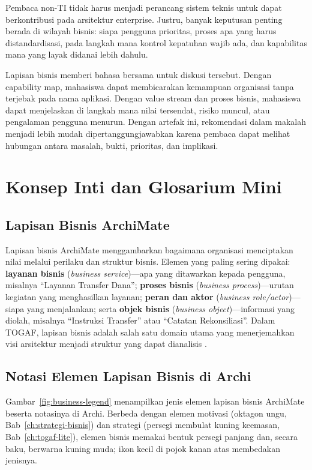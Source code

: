 Pembaca non-TI tidak harus menjadi perancang sistem teknis untuk dapat
berkontribusi pada arsitektur enterprise. Justru, banyak keputusan penting
berada di wilayah bisnis: siapa pengguna prioritas, proses apa yang harus
distandardisasi, pada langkah mana kontrol kepatuhan wajib ada, dan kapabilitas
mana yang layak didanai lebih dahulu.

Lapisan bisnis memberi bahasa bersama untuk diskusi tersebut. Dengan capability
map, mahasiswa dapat membicarakan kemampuan organisasi tanpa terjebak pada nama
aplikasi. Dengan value stream dan proses bisnis, mahasiswa dapat menjelaskan di
langkah mana nilai tersendat, risiko muncul, atau pengalaman pengguna menurun.
Dengan artefak ini, rekomendasi dalam makalah menjadi lebih mudah
dipertanggungjawabkan karena pembaca dapat melihat hubungan antara masalah,
bukti, prioritas, dan implikasi.

\section{Konsep Inti dan Glosarium Mini}

\subsection{Lapisan Bisnis ArchiMate}

Lapisan bisnis ArchiMate menggambarkan bagaimana organisasi menciptakan nilai
melalui perilaku dan struktur bisnis. Elemen yang paling sering dipakai:
\textbf{layanan bisnis} (\emph{business service})---apa yang ditawarkan kepada
pengguna, misalnya ``Layanan Transfer Dana''; \textbf{proses bisnis}
(\emph{business process})---urutan kegiatan yang menghasilkan layanan;
\textbf{peran dan aktor} (\emph{business role/actor})---siapa yang menjalankan;
serta \textbf{objek bisnis} (\emph{business object})---informasi yang diolah,
misalnya ``Instruksi Transfer'' atau ``Catatan Rekonsiliasi''. Dalam TOGAF,
lapisan bisnis adalah salah satu domain utama yang menerjemahkan visi arsitektur
menjadi struktur yang dapat dianalisis \cite{togaf10}.

\subsection{Notasi Elemen Lapisan Bisnis di Archi}

Gambar~\ref{fig:business-legend} menampilkan jenis elemen lapisan bisnis
ArchiMate beserta notasinya di Archi. Berbeda dengan elemen motivasi (oktagon
ungu, Bab~\ref{ch:strategi-bisnis}) dan strategi (persegi membulat kuning
keemasan, Bab~\ref{ch:togaf-lite}), elemen bisnis memakai bentuk persegi panjang
dan, secara baku, berwarna kuning muda; ikon kecil di pojok kanan atas
membedakan jenisnya.

